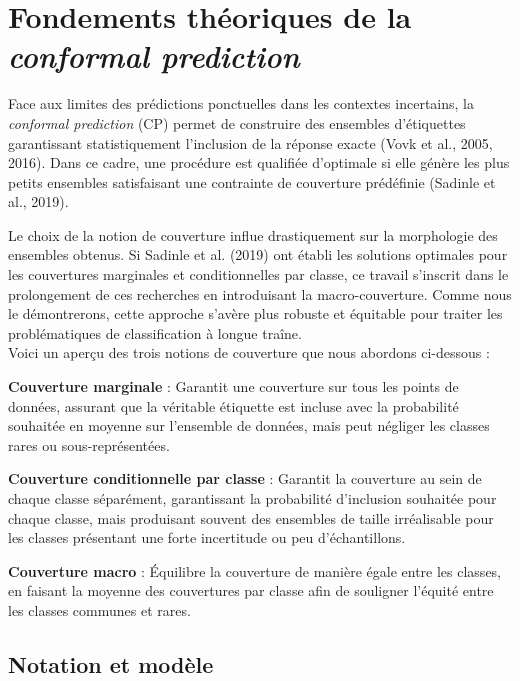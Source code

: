 \documentclass[12pt,a4paper]{article}
\begin{document}
\newpage
\section{Fondements théoriques de la \textit{conformal prediction}}

Face aux limites des prédictions ponctuelles dans les contextes incertains, la \textit{conformal prediction} (CP) permet de construire des ensembles d'étiquettes garantissant statistiquement l'inclusion de la réponse exacte (Vovk et al., 2005, 2016). Dans ce cadre, une procédure est qualifiée d'optimale si elle génère les plus petits ensembles satisfaisant une contrainte de couverture prédéfinie (Sadinle et al., 2019).

Le choix de la notion de couverture influe drastiquement sur la morphologie des ensembles obtenus. Si Sadinle et al. (2019) ont établi les solutions optimales pour les couvertures marginales et conditionnelles par classe, ce travail s'inscrit dans le prolongement de ces recherches en introduisant la macro-couverture. Comme nous le démontrerons, cette approche s'avère plus robuste et équitable pour traiter les problématiques de classification à longue traîne.\\

Voici un aperçu des trois notions de couverture que nous abordons ci-dessous :

\textbf{Couverture marginale} : Garantit une couverture sur tous les points de données, assurant que la véritable étiquette est incluse avec la probabilité souhaitée en moyenne sur l’ensemble de données, mais peut négliger les classes rares ou sous-représentées.

\textbf{Couverture conditionnelle par classe} : Garantit la couverture au sein de chaque classe séparément, garantissant la probabilité d’inclusion souhaitée pour chaque classe, mais produisant souvent des ensembles de taille irréalisable pour les classes présentant une forte incertitude ou peu d’échantillons.

\textbf{Couverture macro} : Équilibre la couverture de manière égale entre les classes, en faisant la moyenne des couvertures par classe afin de souligner l’équité entre les classes communes et rares.





\subsection{Notation et modèle}
\end{document}
